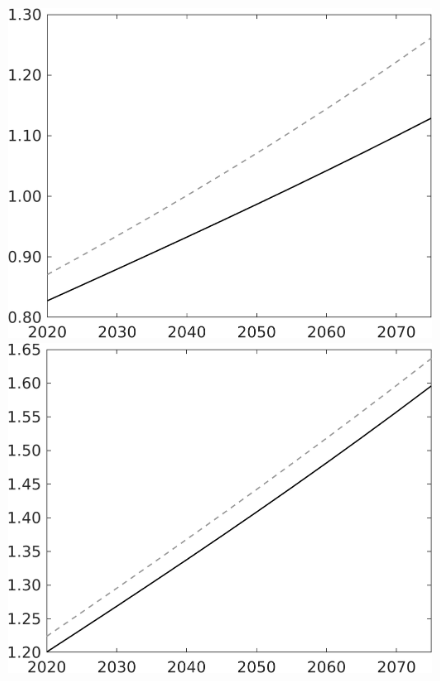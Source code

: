 \documentclass[12pt]{article}
\begin{document}
\begin{figure}[h!!]
\begin{minipage}[]{0.32\textwidth}
	\end{minipage}	
	\begin{minipage}[]{0.32\textwidth}
		\includegraphics[width=1\textwidth]{../../codding_model/own_basedOnFried/optimalPol_010922_revision/figures/all_13Sept22/LevTaufNoTauf_TaulCalib_regime0_E_spillover0_nsk1_xgr1_knspil1_sep1_LFlimit0_emsbase0_countec0_GovRev0_etaa0.79_lgd0.png}
	\end{minipage}	
	\begin{minipage}[]{0.32\textwidth}
		\includegraphics[width=1\textwidth]{../../codding_model/own_basedOnFried/optimalPol_010922_revision/figures/all_13Sept22/LevTaufNoTauf_TaulCalib_regime0_N_spillover0_nsk1_xgr1_knspil1_sep1_LFlimit0_emsbase0_countec0_GovRev0_etaa0.79_lgd0.png}

\end{minipage}
\end{figure}
\end{document}
